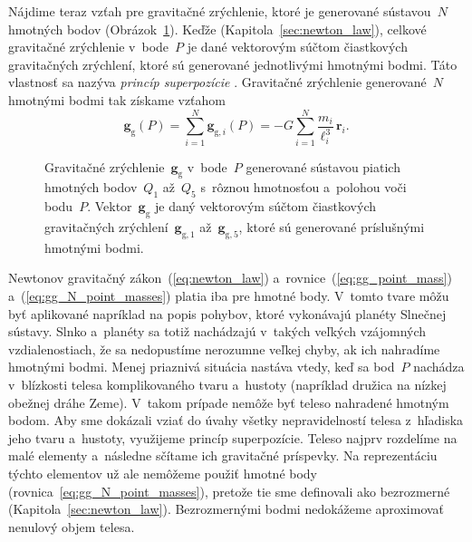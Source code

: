 \documentclass[a4paper, 12pt]{book}
\newcommand{\gidx}{\mathrm g}
\let\vec\mathbf
\begin{document}
Nájdime teraz vzťah pre gravitačné zrýchlenie, ktoré je generované sústavou~$N$ 
hmotných bodov (Obrázok~\ref{fig:gg_n_point_masses}).  Keďže 
 (Kapitola~\ref{sec:newton_law}), celkové gravitačné zrýchlenie 
v~bode~$P$ je dané vektorovým súčtom čiastkových gravitačných zrýchlení, ktoré 
sú generované jednotlivými hmotnými bodmi.  Táto vlastnosť sa nazýva 
\emph{princíp superpozície} \parencite{Hotine}.  Gravitačné zrýchlenie 
generované~$N$ hmotnými bodmi tak získame vzťahom
%
\begin{equation}
\label{eq:gg_N_point_masses}
\vec g_\gidx(P) = \sum_{i = 1}^{N}\vec g_{\gidx,i}(P) = -G \sum_{i = 1}^{N}
\frac{m_i}{\ell_i^3} \, \vec{r}_i{.}
\end{equation}

\begin{figure}
\centering

\caption{Gravitačné zrýchlenie~$\vec g_\gidx$ v~bode~$P$ generované sústavou 
piatich hmotných bodov~$Q_1$ až~$Q_5$ s~rôznou hmotnosťou a~polohou voči 
bodu~$P$.  Vektor~$\vec g_\gidx$ je daný vektorovým súčtom čiastkových 
gravitačných zrýchlení~$\vec g_{\gidx,1}$ až~$\vec g_{\gidx,5}$, ktoré sú 
generované príslušnými hmotnými bodmi.}
\label{fig:gg_n_point_masses}
\end{figure}

Newtonov gravitačný zákon~(\ref{eq:newton_law}) 
a~rovnice~(\ref{eq:gg_point_mass}) a~(\ref{eq:gg_N_point_masses}) platia iba 
pre hmotné body.  V~tomto tvare môžu byť aplikované napríklad na popis pohybov, 
ktoré vykonávajú planéty Slnečnej sústavy.  Slnko a~planéty sa totiž nachádzajú 
v~takých veľkých vzájomných vzdialenostiach, že sa nedopustíme nerozumne veľkej 
chyby, ak ich nahradíme hmotnými bodmi.  Menej priaznivá situácia nastáva 
vtedy, keď sa bod~$P$ nachádza v~blízkosti telesa komplikovaného tvaru 
a~hustoty (napríklad družica na nízkej obežnej dráhe Zeme).  V~takom prípade 
nemôže byť teleso nahradené hmotným bodom.  Aby sme dokázali vziať do úvahy 
všetky nepravidelností telesa z~hľadiska jeho tvaru a~hustoty, využijeme 
princíp superpozície.  Teleso najprv rozdelíme na malé elementy a~následne 
sčítame ich gravitačné príspevky.  Na reprezentáciu týchto elementov už ale 
nemôžeme použiť hmotné body (rovnica~\ref{eq:gg_N_point_masses}), pretože tie 
sme definovali ako bezrozmerné (Kapitola~\ref{sec:newton_law}).  Bezrozmernými 
bodmi nedokážeme aproximovať nenulový objem telesa.
\end{document}
